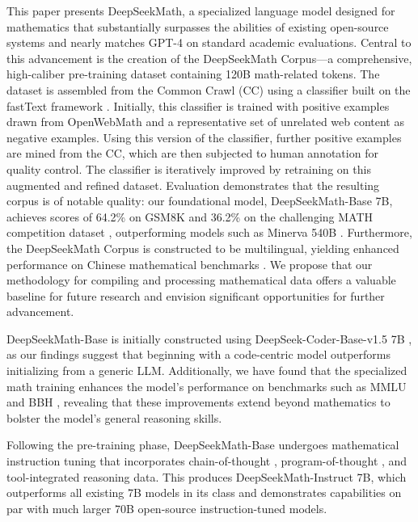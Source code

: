 This paper presents DeepSeekMath, a specialized language model designed for mathematics that substantially surpasses the abilities of existing open-source systems and nearly matches GPT-4 on standard academic evaluations. Central to this advancement is the creation of the DeepSeekMath Corpus—a comprehensive, high-caliber pre-training dataset containing 120B math-related tokens. The dataset is assembled from the Common Crawl (CC) using a classifier built on the fastText framework \citep{joulin2016fasttext}. Initially, this classifier is trained with positive examples drawn from OpenWebMath \citep{openwebmath} and a representative set of unrelated web content as negative examples. Using this version of the classifier, further positive examples are mined from the CC, which are then subjected to human annotation for quality control. The classifier is iteratively improved by retraining on this augmented and refined dataset. Evaluation demonstrates that the resulting corpus is of notable quality: our foundational model, DeepSeekMath-Base 7B, achieves scores of 64.2\% on GSM8K \citep{gsm8k} and 36.2\% on the challenging MATH competition dataset \citep{MATH}, outperforming models such as Minerva 540B \citep{minerva}. Furthermore, the DeepSeekMath Corpus is constructed to be multilingual, yielding enhanced performance on Chinese mathematical benchmarks \citep{wei2023cmath,agieval}. We propose that our methodology for compiling and processing mathematical data offers a valuable baseline for future research and envision significant opportunities for further advancement.

DeepSeekMath-Base is initially constructed using DeepSeek-Coder-Base-v1.5 7B \citep{deepseek-coder}, as our findings suggest that beginning with a code-centric model outperforms initializing from a generic LLM. Additionally, we have found that the specialized math training enhances the model's performance on benchmarks such as MMLU \citep{mmlu} and BBH \citep{bbh}, revealing that these improvements extend beyond mathematics to bolster the model’s general reasoning skills.

Following the pre-training phase, DeepSeekMath-Base undergoes mathematical instruction tuning that incorporates chain-of-thought \citep{cot}, program-of-thought \citep{pot,pal}, and tool-integrated reasoning \citep{tora} data. This produces DeepSeekMath-Instruct 7B, which outperforms all existing 7B models in its class and demonstrates capabilities on par with much larger 70B open-source instruction-tuned models.

